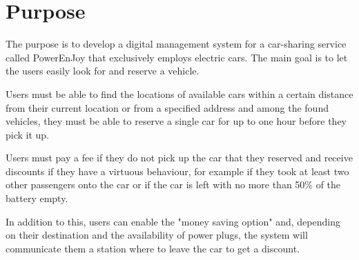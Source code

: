 \section{Purpose}
The purpose is to develop a digital management system for a car-sharing service called PowerEnJoy that exclusively employs electric cars. The main goal is to let the users easily look for and reserve a vehicle. 

Users must be able to find the locations of available cars within a certain distance from their current location or from a specified address and among the found vehicles, they must be able to reserve a single car for up to one hour before they pick it up.

Users must pay a fee if they do not pick up the car that they reserved and receive discounts if they have a virtuous behaviour, for example if they took at least two other passengers onto the car or if the car is left with no more than 50\% of the battery empty.

In addition to this, users can enable the "money saving option" and, depending on their destination and the availability of power plugs, the system will communicate them a station where to leave the car to get a discount.
